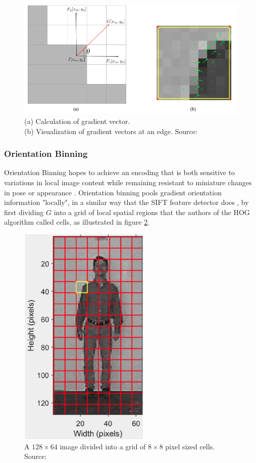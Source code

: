 \begin{figure}
    \centering
    \includegraphics[width=0.75\linewidth]{images/pythagorean.png}
    \caption{(a) Calculation of gradient vector.\\ (b) Visualization of gradient vectors at an edge. Source: \cite{shidlovskiy_2020_reducing}}
    \label{fig:pythagorean}
\end{figure}

\subsubsection{Orientation Binning}

Orientation Binning hopes to achieve an encoding that is both sensitive to variations in local image content while remaining resistant to miniature changes in pose or appearance \cite{dalal_2005_histograms} \cite{shidlovskiy_2020_reducing}. Orientation binning pools gradient orientation information "locally", in a similar way that the SIFT feature detector does \cite{lowe_2004_distinctive}, by first dividing $G$ into a grid of local spatial regions that the authors of the HOG algorithm called cells, as illustrated in figure \ref{fig:cells}.

\begin{figure}
    \centering
    \includegraphics[width=0.2\linewidth]{images/cells.png}
    \caption{A $128\times64$ image divided into a grid of $8\times8$ pixel sized cells. Source: \cite{shidlovskiy_2020_reducing}}
    \label{fig:cells}
\end{figure}

